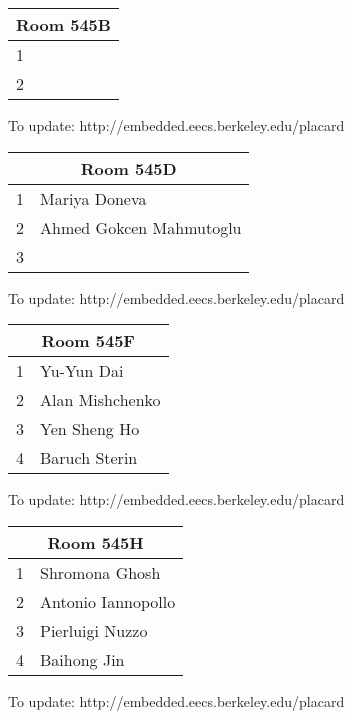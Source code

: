\documentclass{article}
\begin{document}
\Huge
\bfseries

\noindent
\begin{tabular}{|l|l|}
\hline
\multicolumn{2}{|c|}{Room 545B} \\ \hline\hline
1& \\
2& \\

\hline
\end{tabular}

{\scriptsize To update: http://embedded.eecs.berkeley.edu/placard}
\vspace{1in}

\noindent
\begin{tabular}{|l|l|}
\hline
\multicolumn{2}{|c|}{Room 545D} \\ \hline\hline
1&Mariya  Doneva\\
2&Ahmed Gokcen Mahmutoglu\\
3& \\

\hline
\end{tabular}

{\scriptsize To update: http://embedded.eecs.berkeley.edu/placard}
\vspace{1in}

\noindent
\begin{tabular}{|l|l|}
\hline
\multicolumn{2}{|c|}{Room 545F} \\ \hline\hline
1&Yu-Yun Dai\\
2&Alan Mishchenko\\
3&Yen Sheng Ho\\
4&Baruch Sterin\\

\hline
\end{tabular}

{\scriptsize To update: http://embedded.eecs.berkeley.edu/placard}
\vspace{1in}

\noindent
\begin{tabular}{|l|l|}
\hline
\multicolumn{2}{|c|}{Room 545H} \\ \hline\hline
1&Shromona Ghosh\\
2&Antonio Iannopollo\\
3&Pierluigi Nuzzo\\
4&Baihong  Jin\\

\hline
\end{tabular}

{\scriptsize To update: http://embedded.eecs.berkeley.edu/placard}
\vspace{1in}
\end{document}
